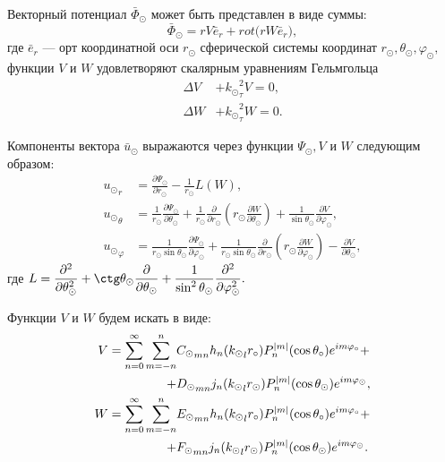 Векторный потенциал $\bar{\Phi}_\odot$ может быть представлен в виде суммы:
$$
\bar{\Phi}_\odot = rV\bar{e}_r +  rot\bigl(rW\bar{e}_r\bigr),
$$
где $\bar{e}_r$ --- орт координатной оси $r_\odot$ сферической системы координат $r_\odot, \theta_\odot, \varphi_\odot,$\\
функции $V$ и $W$ удовлетворяют скалярным уравнениям Гельмгольца
\begin{align}
\Delta V &+ {k_\odot}_\tau^2 V = 0,\label{eq_V}\\
\Delta W &+ {k_\odot}_\tau^2 W = 0.\label{eq_W}
\end{align}

Компоненты вектора $\bar{u}_\odot$ выражаются через функции $\Psi_\odot, V$ и $W$ следующим образом:
\begin{equation}\label{eq_us}
\begin{split}
{u_\odot}_r &= \frac{\partial \Psi_\odot}{\partial r_\odot} - \frac{1}{r_\odot}L(W),\\
{u_\odot}_\theta &= \frac{1}{r_\odot}\frac{\partial \Psi_\odot}{\partial \theta_\odot} + \frac{1}{r_\odot}\frac{\partial}{\partial r_\odot}\left(r_\odot\frac{\partial W}{\partial \theta_\odot}\right) + \frac{1}{\sin\theta_\odot}\frac{\partial V}{\partial\varphi_\odot},\\
{u_\odot}_\varphi &= \frac{1}{r_\odot \sin\theta_\odot}\frac{\partial \Psi_\odot}{\partial \varphi_\odot} + \frac{1}{r_\odot\sin\theta_\odot}\frac{\partial}{\partial r_\odot}\left(r_\odot\frac{\partial W}{\partial \varphi_\odot}\right) - \frac{\partial V}{\partial \theta_\odot},
\end{split}
\end{equation}
где $L = \dfrac{\partial^2}{\partial\theta_\odot^2} + \ctg\theta_\odot\dfrac{\partial}{\partial\theta_\odot} + \dfrac{1}{\sin^2\theta_\odot}\dfrac{\partial^2}{\partial\varphi_\odot^2}.$

Функции $V$ и $W$ будем искать в виде:
\begin{align}
V = \sum\limits_{n=0}^\infty \sum\limits_{m=-n}^n &{C_\odot}_{mn} h_n({k_\odot}_lr_\circ)P_n^{\lvert m\rvert}(\cos\theta_\circ) e^{im\varphi_\circ} + \notag\\
+ &{D_\odot}_{mn} j_n({k_\odot}_lr_\odot)P_n^{\lvert m\rvert}(\cos\theta_\odot) e^{im\varphi_\odot},\label{eq_v}\\
W = \sum\limits_{n=0}^\infty \sum\limits_{m=-n}^n &{E_\odot}_{mn} h_n({k_\odot}_lr_\circ)P_n^{\lvert m\rvert}(\cos\theta_\circ) e^{im\varphi_\circ} + \notag\\
+ &{F_\odot}_{mn} j_n({k_\odot}_lr_\odot)P_n^{\lvert m\rvert}(\cos\theta_\odot) e^{im\varphi_\odot}.\label{eq_w}
\end{align}

